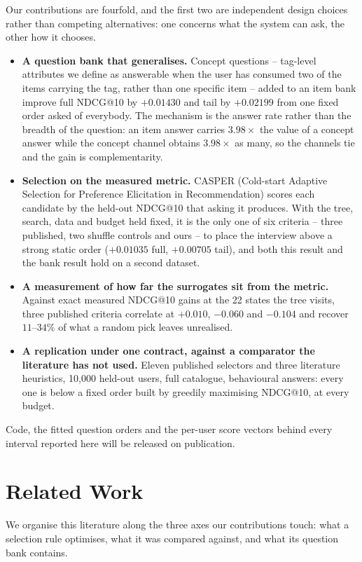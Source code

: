 \documentclass[runningheads]{llncs}
\begin{document}
\noindent Our contributions are fourfold, and the first two are independent design choices rather
than competing alternatives: one concerns what the system can ask, the other how it chooses.
\begin{itemize}
\item \textbf{A question bank that generalises.} Concept questions -- tag-level attributes we define
as answerable when the user has consumed two of the items carrying the tag, rather than one specific
item -- added to an item bank improve full NDCG@10 by $+0.01430$ and tail by $+0.02199$ from one
fixed order asked of everybody. The mechanism is the answer rate rather than the breadth of the
question: an item answer carries $3.98\times$ the value of a concept answer while the concept
channel obtains $3.98\times$ as many, so the channels tie and the gain is complementarity.
\item \textbf{Selection on the measured metric.} CASPER (Cold-start Adaptive Selection for
Preference Elicitation in Recommendation) scores each candidate by the held-out NDCG@10 that asking
it produces. With the tree, search, data and budget held fixed, it is the only one of six criteria --
three published, two shuffle controls and ours -- to place the interview above a strong static order
($+0.01035$ full, $+0.00705$ tail), and both this result and the bank result hold on a second
dataset.
\item \textbf{A measurement of how far the surrogates sit from the metric.} Against exact measured NDCG@10 gains at the 22 states the tree visits, three published criteria
correlate at $+0.010$, $-0.060$ and $-0.104$ and recover $11$--$34\%$ of what a random pick leaves
unrealised.
\item \textbf{A replication under one contract, against a comparator the literature has not used.}
Eleven published selectors and three literature heuristics, 10{,}000 held-out users, full
catalogue, behavioural answers: every one is below a fixed order built by greedily maximising
NDCG@10, at every budget.
\end{itemize}

Code, the fitted question orders and the per-user score vectors behind every interval reported here
will be released on publication.

\section{Related Work}
\label{sec:rw}

We organise this literature along the three axes our contributions touch: what a selection rule
optimises, what it was compared against, and what its question bank contains.
\end{document}
